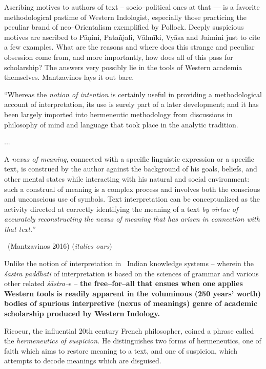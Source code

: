 Ascribing motives to authors of text – socio–political ones at that — is a favorite methodological pastime of Western Indologist, especially those practicing the peculiar brand of neo–Orientalism exemplified by Pollock. Deeply suspicious motives are ascribed to Pāṇini, Patañjali, Vālmīki, Vyāsa and Jaimini just to cite a few examples. What are the reasons and where does this strange and peculiar obsession come from, and more importantly, how does all of this pass for scholarship? The answers very possibly lie in the tools of Western academia themselves. Mantzavinos lays it out bare.

\begin{myquote}
“Whereas the \textit{notion of intention} is certainly useful in providing a methodological account of interpretation, its use is surely part of a later development; and it has been largely imported into hermeneutic methodology from discussions in philosophy of mind and language that took place in the analytic tradition.
\end{myquote}

\begin{myquote}
...
\end{myquote}

\begin{myquote}
A \textit{nexus of meaning}, connected with a specific linguistic expression or a specific text, is construed by the author against the background of his goals, beliefs, and other mental states while interacting with his natural and social environment: such a construal of meaning is a complex process and involves both the conscious and unconscious use of symbols. Text interpretation can be conceptualized as the activity directed at correctly identifying the meaning of a text \textit{by virtue of accurately reconstructing the nexus of meaning that has arisen in connection with that text.”} 

~\hfill (Mantzavinos 2016) (\textit{italics ours})
\end{myquote}

Unlike the notion of interpretation in  Indian knowledge systems – wherein the \textit{śāstra paddhati} of interpretation is based on the sciences of grammar and various other related \textit{śāstra–}s – \textbf{the free–for–all that ensues when one applies Western tools is readily apparent in the voluminous (250 years’ worth) bodies of spurious interpretive (nexus of meanings) genre of academic scholarship produced by Western Indology.}

Ricoeur, the influential 20th century French philosopher, coined a phrase called the \textit{hermeneutics of suspicion.} He distinguishes two forms of hermeneutics, one of faith which aims to restore meaning to a text, and one of suspicion, which attempts to decode meanings which are disguised.

